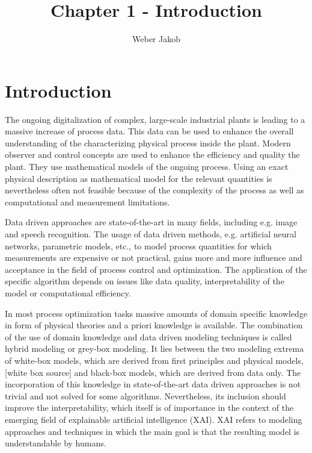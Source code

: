 \documentclass[10pt,a4paper]{article}
\title{Chapter 1 - Introduction}
\author{Weber Jakob}
\begin{document}
	\maketitle

\tableofcontents

\section{Introduction}

The ongoing digitalization of complex, large-scale industrial plants is leading to a massive increase of process data. This data can be used to enhance the overall understanding of the characterizing physical process inside the plant. Modern observer and control concepts are used to enhance the efficiency and quality the plant. They use mathematical models of the ongoing process. Using an exact physical description as mathematical model for the relevant quantities is nevertheless often not feasible because of the complexity of the process as well as computational and measurement limitations.

Data driven approaches are state-of-the-art in many fields, including e.g. image and speech recognition. The usage of data driven methods, e.g. artificial neural networks, parametric models, etc., to model process quantities for which measurements are expensive or not practical, gains more and more influence and acceptance in the field of process control and optimization. The application of the specific algorithm depends on issues like data quality, interpretability of the model or computational efficiency. 

In most process optimization tasks massive amounts of domain specific knowledge in form of physical theories and a priori knowledge is available. The combination of the use of domain knowledge and data driven modeling techniques is called hybrid modeling or grey-box modeling. It lies between the two modeling extrema of white-box models, which are derived from first principles and physical models, [white box source] and black-box models, which are derived from data only.\cite{ashby1961introduction} The incorporation of this knowledge in state-of-the-art data driven approaches is not trivial and not solved for some algorithms. Nevertheless, its inclusion should improve the interpretability, which itself is of importance in the context of the emerging field of explainable artificial intelligence (XAI). XAI refers to modeling approaches and techniques in which the main goal is that the resulting model is understandable by humans. \cite{dovsilovic2018explainable}
\end{document}

